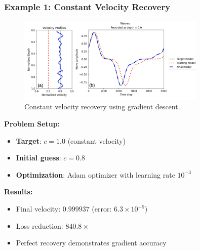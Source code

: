 \documentclass[notes]{beamer}
\begin{document}
\begin{frame}
\frametitle{Example 1: Constant Velocity Recovery}

\begin{figure}[ht]
	\centering
	\includegraphics[width=0.8\textwidth]{figs/constant-profile-fwi.png}
	\caption*{Constant velocity recovery using gradient descent.}
\end{figure}

\textbf{Problem Setup:}
\begin{itemize}
    \item \textbf{Target}: $c = 1.0$ (constant velocity)
    \item \textbf{Initial guess}: $c = 0.8$
    \item \textbf{Optimization}: Adam optimizer with learning rate $10^{-3}$
\end{itemize}

\textbf{Results:}
\begin{itemize}
    \item Final velocity: $0.999937$ (error: $6.3 \times 10^{-5}$)
    \item Loss reduction: $840.8\times$
    \item Perfect recovery demonstrates gradient accuracy
\end{itemize}

\end{frame}
\end{document}

